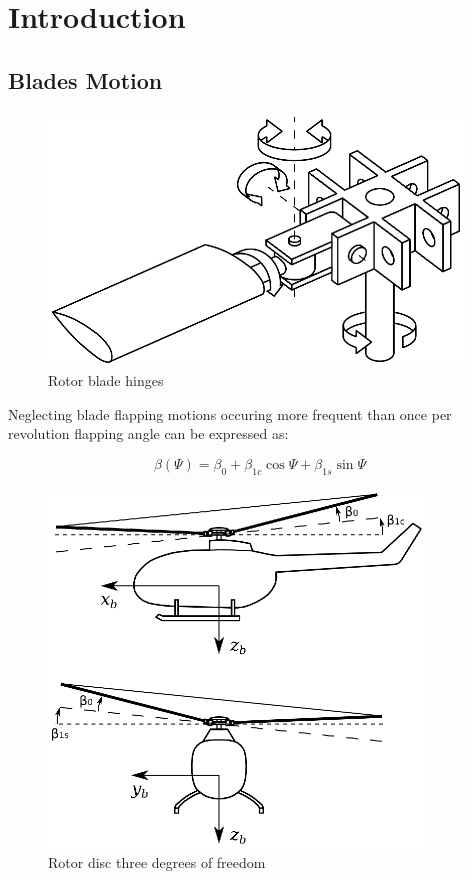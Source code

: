 \chapter{Introduction}

\section{Blades Motion}

\begin{figure}[h!]
  \centering
  \includegraphics[width=110mm]{eps/rotor_hub_hinges.eps}
  \caption{Rotor blade hinges}
\end{figure}

Neglecting blade flapping motions occuring more frequent than once per revolution flapping angle can be expressed as:

\begin{equation}
\beta \left( \Psi \right)
=
\beta_0 + \beta_{1c} \cos \Psi + \beta_{1s} \sin \Psi 
\end{equation}

\begin{figure}[h!]
  \centering
  \includegraphics[width=100mm]{eps/rotor_flapping_angles.eps}
  \caption{Rotor disc three degrees of freedom}
\end{figure}

